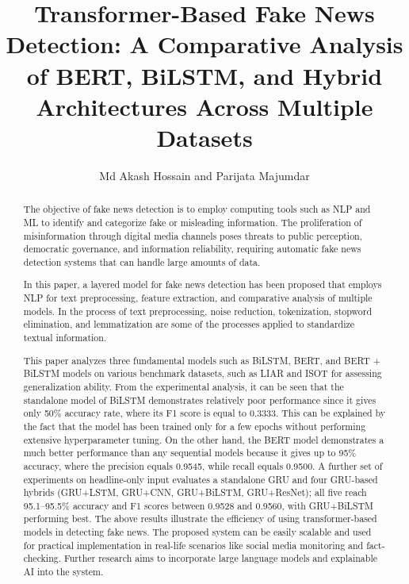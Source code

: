 \documentclass[runningheads]{llncs}
\begin{document}
\title{Transformer-Based Fake News Detection: A Comparative Analysis of BERT, BiLSTM, and Hybrid Architectures Across Multiple Datasets}


\author{Md Akash Hossain and Parijata Majumdar }

\maketitle              %

\begin{abstract}
The objective of fake news detection is to employ computing tools such as NLP and ML to identify and categorize fake or misleading information. The proliferation of misinformation through digital media channels poses threats to public perception, democratic governance, and information reliability, requiring automatic fake news detection systems that can handle large amounts of data.

In this paper, a layered model for fake news detection has been proposed that employs NLP for text preprocessing, feature extraction, and comparative analysis of multiple models. In the process of text preprocessing, noise reduction, tokenization, stopword elimination, and lemmatization are some of the processes applied to standardize textual information.

This paper analyzes three fundamental models such as BiLSTM, BERT, and BERT + BiLSTM models on various benchmark datasets, such as LIAR and ISOT for assessing generalization ability. From the experimental analysis, it can be seen that the standalone model of BiLSTM demonstrates relatively poor performance since it gives only 50\% accuracy rate, where its F1 score is equal to 0.3333. This can be explained by the fact that the model has been trained only for a few epochs without performing extensive hyperparameter tuning. On the other hand, the BERT model demonstrates a much better performance than any sequential models because it gives up to 95\% accuracy, where the precision equals 0.9545, while recall equals 0.9500.
A further set of experiments on headline-only input evaluates a standalone GRU and four GRU-based hybrids (GRU+LSTM, GRU+CNN, GRU+BiLSTM, GRU+ResNet); all five reach 95.1--95.5\% accuracy and F1 scores between 0.9528 and 0.9560, with GRU+BiLSTM performing best.
The above results illustrate the efficiency of using transformer-based models in detecting fake news. The proposed system can be easily scalable and used for practical implementation in real-life scenarios like social media monitoring and fact-checking. Further research aims to incorporate large language models and explainable AI into the system.

\end{abstract}
\end{document}
